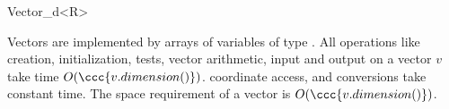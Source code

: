 \begin{ccRefClass}{Vector_d<R>}


\ccImplementation


Vectors are implemented by arrays of variables of type .  All
operations like creation, initialization, tests, vector arithmetic,
input and output on a vector $v$ take time $O(\ccc{v.dimension()})$. 
coordinate access,  and conversions
take constant time.  The space requirement of a vector is
$O(\ccc{v.dimension()})$. 



\end{ccRefClass}


